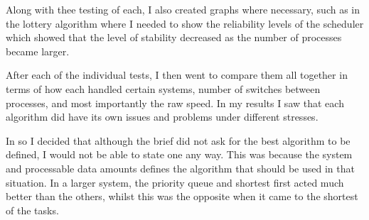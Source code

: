 \documentclass{sig-alternate}
\begin{document}
Along with thee testing of each, I also created graphs where necessary, such as
in the lottery algorithm where I needed to show the reliability levels of the
scheduler which showed that the level of stability decreased as the number of
processes became larger.

After each of the individual tests, I then went to compare them all together in
terms of how each handled certain systems, number of switches between processes,
and most importantly the raw speed. In my results I saw that each algorithm did
have its own issues and problems under different stresses.

In so I decided that although the brief did not ask for the best algorithm to be
defined, I would not be able to state one any way. This was because the system
and processable data amounts defines the algorithm that should be used in that
situation. In a larger system, the priority queue and shortest first acted much
better than the others, whilst this was the opposite when it came to the
shortest of the tasks.
\end{document}
